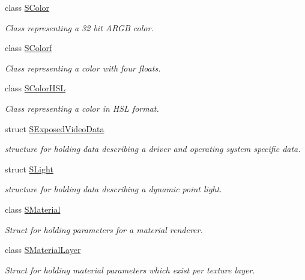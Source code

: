 \begin{DoxyCompactItemize}
class \hyperlink{classirr_1_1video_1_1SColor}{S\+Color}
\begin{DoxyCompactList}\small\item\em Class representing a 32 bit A\+R\+GB color. \end{DoxyCompactList}\item 
class \hyperlink{classirr_1_1video_1_1SColorf}{S\+Colorf}
\begin{DoxyCompactList}\small\item\em Class representing a color with four floats. \end{DoxyCompactList}\item 
class \hyperlink{classirr_1_1video_1_1SColorHSL}{S\+Color\+H\+SL}
\begin{DoxyCompactList}\small\item\em Class representing a color in H\+SL format. \end{DoxyCompactList}\item 
struct \hyperlink{structirr_1_1video_1_1SExposedVideoData}{S\+Exposed\+Video\+Data}
\begin{DoxyCompactList}\small\item\em structure for holding data describing a driver and operating system specific data. \end{DoxyCompactList}\item 
struct \hyperlink{structirr_1_1video_1_1SLight}{S\+Light}
\begin{DoxyCompactList}\small\item\em structure for holding data describing a dynamic point light. \end{DoxyCompactList}\item 
class \hyperlink{classirr_1_1video_1_1SMaterial}{S\+Material}
\begin{DoxyCompactList}\small\item\em Struct for holding parameters for a material renderer. \end{DoxyCompactList}\item 
class \hyperlink{classirr_1_1video_1_1SMaterialLayer}{S\+Material\+Layer}
\begin{DoxyCompactList}\small\item\em Struct for holding material parameters which exist per texture layer. \end{DoxyCompactList}\end{DoxyCompactItemize}
